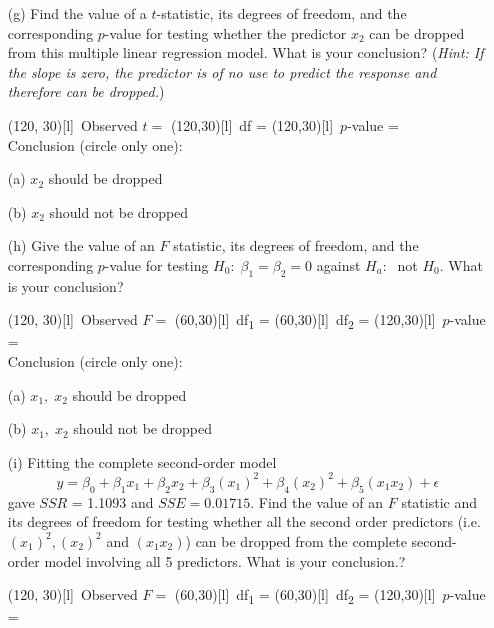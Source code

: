 \documentclass[11pt]{article}
\begin{document}
{\begin{enumerate}
 \hfill \framebox(300, 30)[l]{\, upper pred. bd = }
\vskip 7cm

\item[(g)] Find the value of a $t$-statistic, its degrees of
freedom, and the corresponding $p$-value for testing whether the
predictor $x_2$ can be dropped from this multiple linear regression
model. What is your conclusion? (\emph{Hint: If the slope is zero, the predictor is of no use to predict the response and therefore can be dropped.})


\framebox(120, 30)[l]{\, 
 Observed $t =$ }
 \hfill
\framebox(120,30)[l]{\, df =}
 \hfill
\framebox(120,30)[l]{\, 
 $p$-value = }\\
Conclusion (circle only one): \hfill 

\hskip 2cm(a) $x_2$ should be dropped

\hskip 2cm(b) $x_2$ should not be dropped


\item[(h)] Give  the value of an $F$ statistic, its degrees of freedom, and the
corresponding $p$-value for testing $H_0: \; \beta_1=\beta_2=0$
against $H_a:\; $ not $H_0$. What is your conclusion?

\vskip 0.25cm

\framebox(120, 30)[l]{\, 
 Observed $F =$ }
 \hfill
\framebox(60,30)[l]{\, df\textsubscript{1} =}
 \hfill
 \framebox(60,30)[l]{\, df\textsubscript{2} =}
 \hfill
\framebox(120,30)[l]{\, 
 $p$-value = }\\

Conclusion (circle only one):

\hskip 2cm(a) $x_1, \; x_2$ should be
dropped 

\hskip 2cm(b) $x_1, \; x_2$ should not be dropped

\item[(i)]Fitting the complete second-order model
%
$$y = \beta_0 + \beta_1 x_1+ \beta_2 x_2+ \beta_3 (x_1)^2+ \beta_4
(x_2)^2 + \beta_5 (x_1 x_2) + \epsilon$$
%
gave $SSR$ = 1.1093 and $SSE=0.01715$. Find the value of an $F$
statistic and its degrees of freedom for testing whether all the
second order predictors  (i.e.  $(x_1)^2, (x_2)^2$ and $(x_1 x_2)$)
can be dropped from the complete second-order model involving all 5
predictors. What is your conclusion.?

\vskip 8cm

\framebox(120, 30)[l]{\, 
 Observed $F =$ }
 \hfill
\framebox(60,30)[l]{\, df\textsubscript{1} =}
 \hfill
 \framebox(60,30)[l]{\, df\textsubscript{2} =}
 \hfill
\framebox(120,30)[l]{\, 
 $p$-value = }\\


\end{enumerate}}
\end{document}

